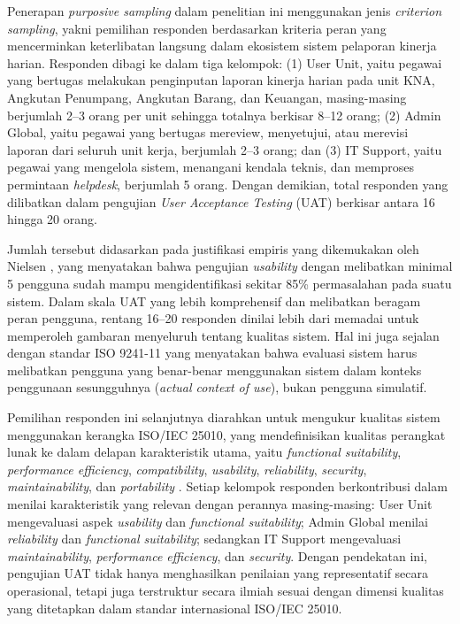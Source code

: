Penerapan \textit{purposive sampling} dalam penelitian ini menggunakan jenis \textit{criterion sampling}, yakni pemilihan responden berdasarkan kriteria peran yang mencerminkan keterlibatan langsung dalam ekosistem sistem pelaporan kinerja harian. Responden dibagi ke dalam tiga kelompok: (1) User Unit, yaitu pegawai yang bertugas melakukan penginputan laporan kinerja harian pada unit KNA, Angkutan Penumpang, Angkutan Barang, dan Keuangan, masing-masing berjumlah 2--3 orang per unit sehingga totalnya berkisar 8--12 orang; (2) Admin Global, yaitu pegawai yang bertugas mereview, menyetujui, atau merevisi laporan dari seluruh unit kerja, berjumlah 2--3 orang; dan (3) IT Support, yaitu pegawai yang mengelola sistem, menangani kendala teknis, dan memproses permintaan \textit{helpdesk}, berjumlah 5 orang. Dengan demikian, total responden yang dilibatkan dalam pengujian \textit{User Acceptance Testing} (UAT) berkisar antara 16 hingga 20 orang. \par

Jumlah tersebut didasarkan pada justifikasi empiris yang dikemukakan oleh Nielsen \cite{nielsen2000}, yang menyatakan bahwa pengujian \textit{usability} dengan melibatkan minimal 5 pengguna sudah mampu mengidentifikasi sekitar 85\% permasalahan pada suatu sistem. Dalam skala UAT yang lebih komprehensif dan melibatkan beragam peran pengguna, rentang 16--20 responden dinilai lebih dari memadai untuk memperoleh gambaran menyeluruh tentang kualitas sistem. Hal ini juga sejalan dengan standar ISO 9241-11 \cite{iso1998} yang menyatakan bahwa evaluasi sistem harus melibatkan pengguna yang benar-benar menggunakan sistem dalam konteks penggunaan sesungguhnya (\textit{actual context of use}), bukan pengguna simulatif. \par

Pemilihan responden ini selanjutnya diarahkan untuk mengukur kualitas sistem menggunakan kerangka ISO/IEC 25010, yang mendefinisikan kualitas perangkat lunak ke dalam delapan karakteristik utama, yaitu \textit{functional suitability}, \textit{performance efficiency}, \textit{compatibility}, \textit{usability}, \textit{reliability}, \textit{security}, \textit{maintainability}, dan \textit{portability} \cite{iso2011}. Setiap kelompok responden berkontribusi dalam menilai karakteristik yang relevan dengan perannya masing-masing: User Unit mengevaluasi aspek \textit{usability} dan \textit{functional suitability}; Admin Global menilai \textit{reliability} dan \textit{functional suitability}; sedangkan IT Support mengevaluasi \textit{maintainability}, \textit{performance efficiency}, dan \textit{security}. Dengan pendekatan ini, pengujian UAT tidak hanya menghasilkan penilaian yang representatif secara operasional, tetapi juga terstruktur secara ilmiah sesuai dengan dimensi kualitas yang ditetapkan dalam standar internasional ISO/IEC 25010. \par

